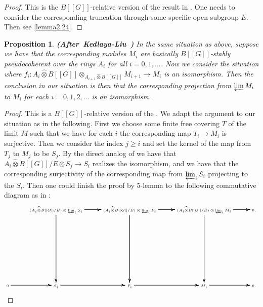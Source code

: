 \documentclass[12pt]{amsart}
\newtheorem{proposition}[theorem]{Proposition}
\theoremstyle{definition}
\numberwithin{equation}{section}
\begin{document}
\begin{proof}
This is the $B[[G]]$-relative version of the result in \cite[Lemma 2.6.3]{KL2}. One needs to consider the corresponding truncation through some specific open subgroup $E$. Then see \cref{lemma2.24}.	
\end{proof}


\begin{proposition} \mbox{\bf{(After Kedlaya-Liu \cite[Lemma 2.6.4]{KL2})}} In the same situation as above, suppose we have that the corresponding modules $M_i$ are basically $B[[G]]$-stably pseudocoherent over the rings $A_i$ for all $i=0,1,...$. Now we consider the situation where $f_i:A_i\widehat{\otimes}B[[G]]\otimes_{A_{i+1}\widehat{\otimes}B[[G]]}M_{i+1}\rightarrow M_i$ is an isomorphism. Then the conclusion in our situation is then that the corresponding projection from $\varprojlim M_i$ to $M_i$ for each $i=0,1,2,...$ is an isomorphism. 

	
\end{proposition}




\begin{proof}
This is a $B[[G]]$-relative version of the \cite[Lemma 2.6.4]{KL2}. We adapt the argument to our situation as in the following. First we choose some finite free covering $T$ of the limit $M$ such that we have for each $i$ the corresponding map $T_i\rightarrow M_i$ is surjective. Then we consider the index $j\geq i$ and set the kernel of the map from $T_j$ to $M_j$ to be $S_j$. By the direct analog of \cite[Lemma 2.5.6]{KL2} we have that $A_i\widehat{\otimes}B[[G]]/E\otimes S_j\overset{}{\rightarrow}S_i$ realizes the isomorphism, and we have that the corresponding surjectivity of the corresponding map from $\varprojlim_i S_i$ projecting to the $S_i$. Then one could finish the proof by 5-lemma to the following commutative diagram as in \cite[Lemma 2.6.4]{KL2}:
\[ \tiny
\xymatrix@C+0pc@R+6pc{
 &(A_i\widehat{\otimes}B[[G]]/E)\otimes \varprojlim_i S_i \ar[r]\ar[r]\ar[r] \ar[d]\ar[d]\ar[d] &(A_i\widehat{\otimes}B[[G]]/E)\otimes \varprojlim_i F_i \ar[r]\ar[r]\ar[r] \ar[d]\ar[d]\ar[d] &(A_i\widehat{\otimes}B[[G]]/E)\otimes \varprojlim_i M_i\ar[r]\ar[r]\ar[r]  \ar[d]\ar[d]\ar[d]&0,\\
0 \ar[r]\ar[r]\ar[r] &S_i   \ar[r]\ar[r]\ar[r] &F_i \ar[r]\ar[r]\ar[r] &M_i \ar[r]\ar[r]\ar[r] &0.\\
}
\]
 
\end{proof}
\end{document}
